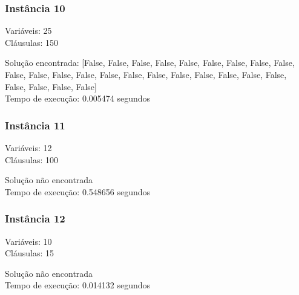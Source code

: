 \documentclass[12pt]{article}
\begin{document}
    \subsubsection{Instância 10}
        \begin{tcolorbox}[title=Entrada da instância 10, width=\linewidth, fontupper=\ttfamily,  halign=flush left]
            Variáveis: 25 \\
            Cláusulas: 150
        \end{tcolorbox}
        \begin{tcolorbox}[title=Saída da instância 10, width=\linewidth, fontupper=\ttfamily, halign=flush left]
            Solução encontrada: [False, False, False, False, False, False, False, False, False, False, False, False, False, False, False, False, False, False, False, False, False, False, False, False, False] \\
            Tempo de execução: 0.005474 segundos
        \end{tcolorbox}

    \subsubsection{Instância 11}
        \begin{tcolorbox}[title=Entrada da instância 11, width=\linewidth, fontupper=\ttfamily,  halign=flush left]
            Variáveis: 12 \\
            Cláusulas: 100
        \end{tcolorbox}
        \begin{tcolorbox}[title=Saída da instância 11, width=\linewidth, fontupper=\ttfamily, halign=flush left]
            Solução não encontrada \\
            Tempo de execução: 0.548656 segundos
        \end{tcolorbox}
    \subsubsection{Instância 12}
        \begin{tcolorbox}[title=Entrada da instância 12, width=\linewidth, fontupper=\ttfamily,  halign=flush left]
            Variáveis: 10 \\
            Cláusulas: 15
        \end{tcolorbox}
        \begin{tcolorbox}[title=Saída da instância 12, width=\linewidth, fontupper=\ttfamily, halign=flush left]
            Solução não encontrada \\
            Tempo de execução: 0.014132 segundos
        \end{tcolorbox}
\end{document}
